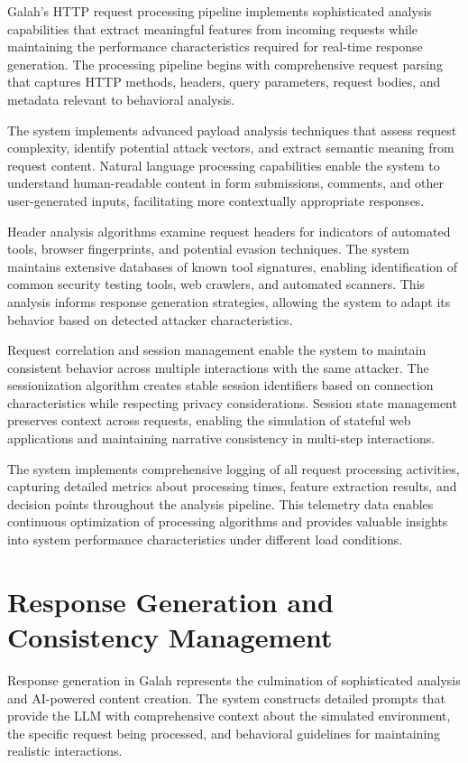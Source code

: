 Galah's HTTP request processing pipeline implements sophisticated analysis capabilities that extract meaningful features from incoming requests while maintaining the performance characteristics required for real-time response generation. The processing pipeline begins with comprehensive request parsing that captures HTTP methods, headers, query parameters, request bodies, and metadata relevant to behavioral analysis.

The system implements advanced payload analysis techniques that assess request complexity, identify potential attack vectors, and extract semantic meaning from request content. Natural language processing capabilities enable the system to understand human-readable content in form submissions, comments, and other user-generated inputs, facilitating more contextually appropriate responses.

Header analysis algorithms examine request headers for indicators of automated tools, browser fingerprints, and potential evasion techniques. The system maintains extensive databases of known tool signatures, enabling identification of common security testing tools, web crawlers, and automated scanners. This analysis informs response generation strategies, allowing the system to adapt its behavior based on detected attacker characteristics.

Request correlation and session management enable the system to maintain consistent behavior across multiple interactions with the same attacker. The sessionization algorithm creates stable session identifiers based on connection characteristics while respecting privacy considerations. Session state management preserves context across requests, enabling the simulation of stateful web applications and maintaining narrative consistency in multi-step interactions.

The system implements comprehensive logging of all request processing activities, capturing detailed metrics about processing times, feature extraction results, and decision points throughout the analysis pipeline. This telemetry data enables continuous optimization of processing algorithms and provides valuable insights into system performance characteristics under different load conditions.

\section{Response Generation and Consistency Management}

Response generation in Galah represents the culmination of sophisticated analysis and AI-powered content creation. The system constructs detailed prompts that provide the LLM with comprehensive context about the simulated environment, the specific request being processed, and behavioral guidelines for maintaining realistic interactions.

